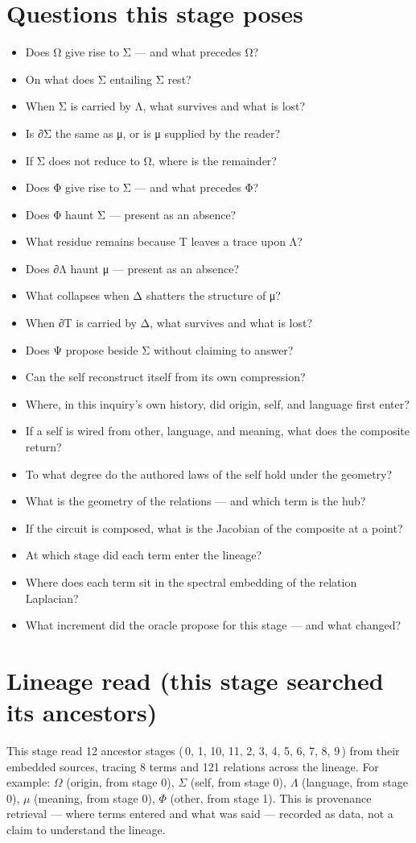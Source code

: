 \documentclass[11pt]{article}
\begin{document}
\section*{Questions this stage poses}\begin{itemize}\item Does Ω give rise to Σ — and what precedes Ω?
\item On what does Σ entailing Σ rest?
\item When Σ is carried by Λ, what survives and what is lost?
\item Is ∂Σ the same as μ, or is μ supplied by the reader?
\item If Σ does not reduce to Ω, where is the remainder?
\item Does Φ give rise to Σ — and what precedes Φ?
\item Does Φ haunt Σ — present as an absence?
\item What residue remains because Τ leaves a trace upon Λ?
\item Does ∂Λ haunt μ — present as an absence?
\item What collapses when Δ shatters the structure of μ?
\item When ∂Τ is carried by Δ, what survives and what is lost?
\item Does Ψ propose beside Σ without claiming to answer?
\item Can the self reconstruct itself from its own compression?
\item Where, in this inquiry's own history, did origin, self, and language first enter?
\item If a self is wired from other, language, and meaning, what does the composite return?
\item To what degree do the authored laws of the self hold under the geometry?
\item What is the geometry of the relations — and which term is the hub?
\item If the circuit is composed, what is the Jacobian of the composite at a point?
\item At which stage did each term enter the lineage?
\item Where does each term sit in the spectral embedding of the relation Laplacian?
\item What increment did the oracle propose for this stage — and what changed?\end{itemize}
\section*{Lineage read (this stage searched its ancestors)}This stage read 12 ancestor stages (\,0, 1, 10, 11, 2, 3, 4, 5, 6, 7, 8, 9\,) from their embedded sources, tracing 8 terms and 121 relations across the lineage. For example: $ \Omega $ (origin, from stage 0), $ \Sigma $ (self, from stage 0), $ \Lambda $ (language, from stage 0), $ \mu $ (meaning, from stage 0), $ \Phi $ (other, from stage 1). This is provenance retrieval --- where terms entered and what was said --- recorded as data, not a claim to understand the lineage.
\end{document}
